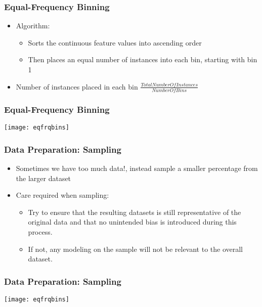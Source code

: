 \begin{frame}[fragile]\frametitle{Equal-Frequency Binning}	
\begin{itemize}
\item Algorithm:
	\begin{itemize}
	\item Sorts the continuous feature values into ascending order 
	\item Then places an equal number of instances into each bin, starting with bin 1 
	\end{itemize}
\item Number of instances placed in each bin $\frac{TotalNumberOfInstances}{NumberOfBins}$
\end{itemize}
\end{frame}


\begin{frame}[fragile]\frametitle{Equal-Frequency Binning}	
\begin{center}
\texttt{[image: eqfrqbins]}
\end{center}
\end{frame}

\begin{frame}[fragile]\frametitle{Data Preparation: Sampling}	
\begin{itemize}
\item Sometimes we have too much data!, instead sample a smaller percentage from the larger dataset
\item Care required when sampling:
	\begin{itemize}
	\item Try to ensure that the resulting datasets is still representative of the original data and that no unintended bias is introduced during this process. 
	\item If not, any modeling on the sample will not be relevant to the overall dataset.
	\end{itemize}
\end{itemize}
\end{frame}

\begin{frame}[fragile]\frametitle{Data Preparation: Sampling}	
\begin{center}
\texttt{[image: eqfrqbins]}
\end{center}
\end{frame}



